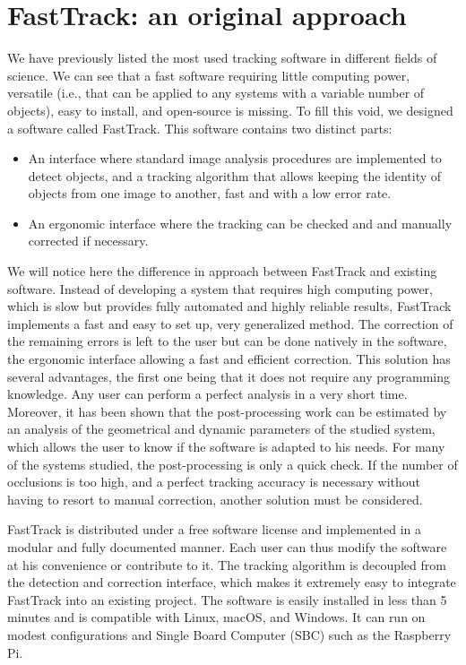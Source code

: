     \section{FastTrack: an original approach}
    We have previously listed the most used tracking software in different fields of science. We can see that a fast software requiring little computing power, versatile (i.e., that can be applied to any systems with a variable number of objects), easy to install, and open-source is missing.
    To fill this void, we designed a software called FastTrack. This software contains two distinct parts:
    \begin{itemize}
        \item An interface where standard image analysis procedures are implemented to detect objects, and a tracking algorithm that allows keeping the identity of objects from one image to another, fast and with a low error rate.
        \item An ergonomic interface where the tracking can be checked and and manually corrected if necessary.
    \end{itemize}
    We will notice here the difference in approach between FastTrack and existing software. Instead of developing a system that requires high computing power, which is slow but provides fully automated and highly reliable results, FastTrack implements a fast and easy to set up, very generalized method. The correction of the remaining errors is left to the user but can be done natively in the software, the ergonomic interface allowing a fast and efficient correction.
    This solution has several advantages, the first one being that it does not require any programming knowledge. Any user can perform a perfect analysis in a very short time. Moreover, it has been shown that the post-processing work can be estimated by an analysis of the geometrical and dynamic parameters of the studied system, which allows the user to know if the software is adapted to his needs. For many of the systems studied, the post-processing is only a quick check. If the number of occlusions is too high, and a perfect tracking accuracy is necessary without having to resort to manual correction, another solution must be considered.

    FastTrack is distributed under a free software license and implemented in a modular and fully documented manner. Each user can thus modify the software at his convenience or contribute to it. The tracking algorithm is decoupled from the detection and correction interface, which makes it extremely easy to integrate FastTrack into an existing project. The software is easily installed in less than 5 minutes and is compatible with Linux, macOS, and Windows. It can run on modest configurations and Single Board Computer (SBC) such as the Raspberry Pi.

